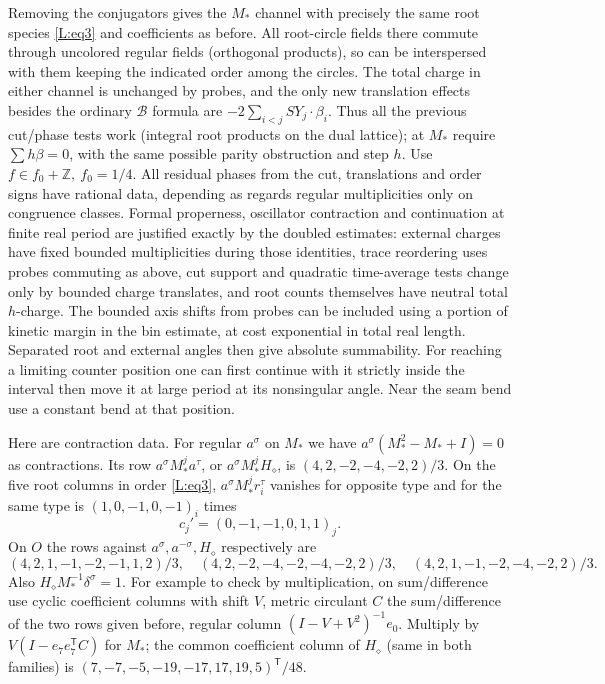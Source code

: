 Removing the conjugators gives the \(M_*\) channel with precisely the same root species \eqref{L:eq3} and coefficients as before. All root-circle fields there commute through uncolored regular fields (orthogonal products), so can be interspersed with them keeping the indicated order among the circles. The total charge in either channel is unchanged by probes, and the only new translation effects besides the ordinary \(\mathcal B\) formula are \(-2\sum_{i<j}SY_j\cdot\beta_i\). Thus all the previous cut/phase tests work (integral root products on the dual lattice); at \(M_*\) require \(\sum h\beta=0\), with the same possible parity obstruction and step \(h\). Use \(f\in f_0+\mathbb Z,\ f_0=1/4\). All residual phases from the cut, translations and order signs have rational data, depending as regards regular multiplicities only on congruence classes. Formal properness, oscillator contraction and continuation at finite real period are justified exactly by the doubled estimates: external charges have fixed bounded multiplicities during those identities, trace reordering uses probes commuting as above, cut support and quadratic time-average tests change only by bounded charge translates, and root counts themselves have neutral total \(h\)-charge. The bounded axis shifts from probes can be included using a portion of kinetic margin in the bin estimate, at cost exponential in total real length. Separated root and external angles then give absolute summability. For reaching a limiting counter position one can first continue with it strictly inside the interval then move it at large period at its nonsingular angle. Near the seam bend use a constant bend at that position.

Here are contraction data. For regular \(a^\sigma\) on \(M_*\) we have \(a^\sigma(M_*^2-M_*+I)=0\) as contractions. Its row \(a^\sigma M_*^j a^\tau\), or \(a^\sigma M_*^j H_\diamond\), is \((4,2,-2,-4,-2,2)/3\). On the five root columns in order \eqref{L:eq3}, \(a^\sigma M_*^j r_i^\tau\) vanishes for opposite type and for the same type is \((1,0,-1,0,-1)_i\) times
\[
 c_j'=(0,-1,-1,0,1,1)_j .
\]
On \(O\) the rows against \(a^\sigma,a^{-\sigma},H_\diamond\) respectively are
\[
 (4,2,1,-1,-2,-1,1,2)/3,\quad
 (4,2,-2,-4,-2,-4,-2,2)/3,\quad
 (4,2,1,-1,-2,-4,-2,2)/3 .
\]
Also \(H_\diamond M_*^{-1}\delta^\sigma=1\). For example to check by multiplication, on sum/difference use cyclic coefficient columns with shift \(V\), metric circulant \(C\) the sum/difference of the two rows given before, regular column \((I-V+V^2)^{-1}e_0\). Multiply by \(V(I-e_7 e_7^{\mathsf T}C)\) for \(M_*\); the common coefficient column of \(H_\diamond\) (same in both families) is \((7,-7,-5,-19,-17,17,19,5)^{\mathsf T}/48\).

